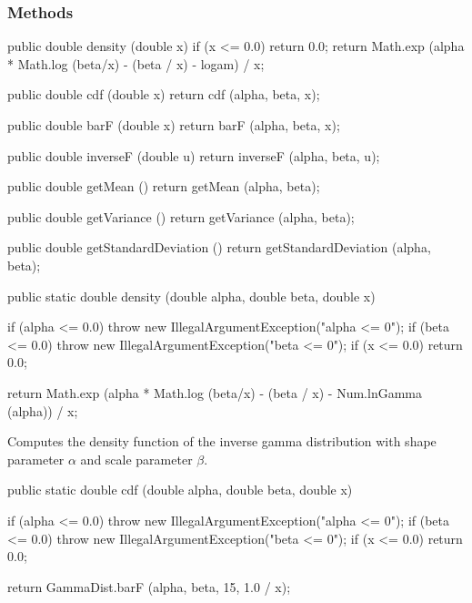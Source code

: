 \subsubsection* {Methods}
\begin{code}\begin{hide}

   public double density (double x) {
      if (x <= 0.0)
         return 0.0;
      return Math.exp (alpha * Math.log (beta/x) - (beta / x) - logam) / x;
   }

   public double cdf (double x) {
      return cdf (alpha, beta, x);
   }

   public double barF (double x) {
      return barF (alpha, beta, x);
   }

   public double inverseF (double u) {
      return inverseF (alpha, beta, u);
   }

   public double getMean () {
      return getMean (alpha, beta);
   }

   public double getVariance () {
      return getVariance (alpha, beta);
   }

   public double getStandardDeviation () {
      return getStandardDeviation (alpha, beta);
   }\end{hide}

   public static double density (double alpha, double beta, double x)\begin{hide} {
      if (alpha <= 0.0)
         throw new IllegalArgumentException("alpha <= 0");
      if (beta <= 0.0)
         throw new IllegalArgumentException("beta <= 0");
      if (x <= 0.0)
         return 0.0;

      return Math.exp (alpha * Math.log (beta/x) - (beta / x) - Num.lnGamma (alpha)) / x;
   }\end{hide}
\end{code}
\begin{tabb}
 Computes the density function of the inverse gamma distribution with shape
 parameter $\alpha$ and scale parameter $\beta$.
\end{tabb}
\begin{code}

   public static double cdf (double alpha, double beta, double x)\begin{hide} {
      if (alpha <= 0.0)
         throw new IllegalArgumentException("alpha <= 0");
      if (beta <= 0.0)
         throw new IllegalArgumentException("beta <= 0");
      if (x <= 0.0)
         return 0.0;

      return GammaDist.barF (alpha, beta, 15, 1.0 / x);
   }\end{hide}
\end{code}
